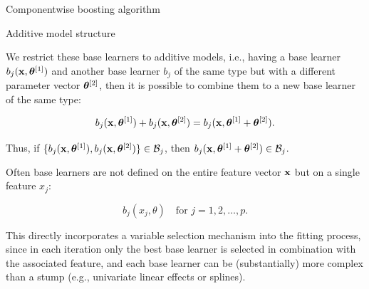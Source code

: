 \documentclass[11pt,compress,t,notes=noshow, xcolor=table]{beamer}
\begin{document}
\begin{vbframe}{Componentwise boosting algorithm}



\end{vbframe}
\begin{vbframe}{Additive model structure}
\begin{footnotesize}
We restrict these base learners to additive models, i.e., having a base learner $ b_j(\mathbf{x}, \bm{\theta}^{[1]})$ and another base learner $b_j$ of the same type but with a different parameter vector $\bm{\theta}^{[2]}$, then it is possible to combine them to a new base learner of the same type:

$$
 b_j(\mathbf{x}, \bm{\theta}^{[1]}) + b_j(\mathbf{x}, \bm{\theta}^{[2]}) =
 b_j(\mathbf{x}, \bm{\theta}^{[1]} + \bm{\theta}^{[2]}).
$$
\vspace*{0.1cm}

Thus, if $\{ b_j(\mathbf{x}, \bm{\theta}^{[1]}), b_j(\mathbf{x}, \bm{\theta}^{[2]}) \} \in \mathcal{B}_j$, then $b_j(\mathbf{x}, \bm{\theta}^{[1]} + \bm{\theta}^{[2]}) \in \mathcal{B}_j$.
\lz

Often base learners are not defined on the entire feature vector $\mathbf{x}$ but on
a single feature $x_j$:

$$
  b_j(x_j, \theta) \quad \text{for } j = 1, 2, \dots, p.
$$

This directly incorporates a variable selection mechanism into the fitting
process, since in each iteration only the best base learner is selected in
combination with the associated feature, and each base learner can be
(substantially) more complex than a stump (e.g., univariate linear effects or
splines).
\end{footnotesize}
\end{vbframe}



\end{document}
